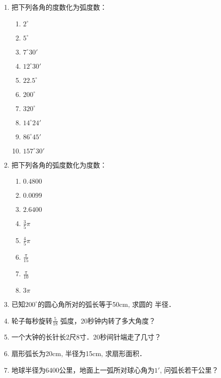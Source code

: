 \begin{ex}
\begin{enumerate}
    \item 把下列各角的度数化为弧度数：
\begin{multicols}{3}
    \begin{enumerate}
    \item $2^{\circ}$
    \item $5^{\circ}$
    \item $7^{\circ}30'$
    \item $12^{\circ}30'$
    \item $22.5^{\circ}$
    \item $200^{\circ}$
    \item $320^{\circ}$
    \item $14^{\circ}24'$
    \item $86^{\circ}45'$
    \item  $157^{\circ}30'$
\end{enumerate}
\end{multicols}

\item 把下列各角的弧度数化为度数：
 \begin{multicols}{3}
    \begin{enumerate}
        \item $0.4800$
        \item $0.0099$ 
        \item $2.6400$
        \item $\frac{3}{5}\pi$
        \item $\frac{4}{5}\pi$
        \item $\frac{\pi}{15}$
        \item $\frac{\pi}{10}$
        \item $3\pi$
\end{enumerate}
\end{multicols}

\item 已知$200^{\circ}$的圆心角所对的弧长等于50cm, 求圆的
半径．
\item 轮子每秒旋转$\frac{5}{18}$
弧度，20秒钟内转了多大角度？
\item 一个大钟的长针长2尺8寸．20秒间针端走了几寸？
\item 扇形弧长为20cm, 半径为15cm, 求扇形面积．
\item 地球半径为6400公里，地面上一弧所对球心角为$1'$,
问弧长若干公里？
\end{enumerate}
\end{ex}

